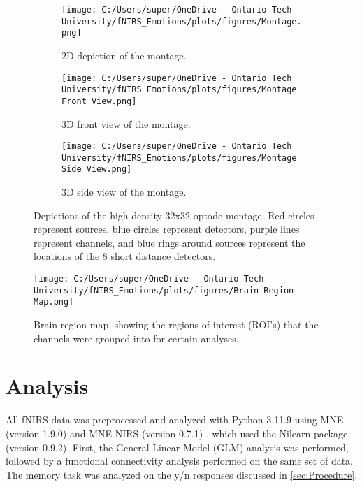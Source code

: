 \begin{figure}[H]
    \centering
    \begin{subfigure}[b]{0.8\textwidth}
        \centering
        \texttt{[image: C:/Users/super/OneDrive - Ontario Tech University/fNIRS\_Emotions/plots/figures/Montage.png]}
        \caption{2D depiction of the montage. }
        \label{fig:montage_2d}
    \end{subfigure}
    \hfill
    \begin{subfigure}[b]{0.45\textwidth}
        \centering
        \texttt{[image: C:/Users/super/OneDrive - Ontario Tech University/fNIRS\_Emotions/plots/figures/Montage Front View.png]}
        \caption{3D front view of the montage.}
        \label{fig:montage_front}
    \end{subfigure}
    \hfill
    \begin{subfigure}[b]{0.45\textwidth}
        \centering
        \texttt{[image: C:/Users/super/OneDrive - Ontario Tech University/fNIRS\_Emotions/plots/figures/Montage Side View.png]}
        \caption{3D side view of the montage.}
        \label{fig:montage_side}
    \end{subfigure}
    \caption[Montage depictions]{Depictions of the high density 32x32 optode montage. Red circles represent sources, blue circles represent detectors, purple lines represent channels, and blue rings around sources represent the locations of the 8 short distance detectors.}
    \label{fig:montage_combined}
\end{figure}

\begin{figure}[H]
    \centering
    \texttt{[image: C:/Users/super/OneDrive - Ontario Tech University/fNIRS\_Emotions/plots/figures/Brain Region Map.png]}
    \caption[Brain region map for ROI grouping]{Brain region map, showing the regions of interest (ROI's) that the channels were grouped into for certain analyses. }
    \label{fig:brain_region_map}
\end{figure}

\section{Analysis}
All fNIRS data was preprocessed and analyzed with Python 3.11.9 using MNE (version 1.9.0) \citep{gramfort_meg_2013} and MNE-NIRS (version 0.7.1) \citep{luke_analysis_2021}, which used the Nilearn package (version 0.9.2). 
First, the General Linear Model (GLM) analysis was performed, followed by a functional connectivity analysis performed on the same set of data.
The memory task was analyzed on the y/n responses discussed in \ref{sec:Procedure}.

